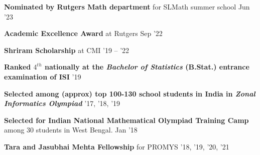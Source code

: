 \resumeProjectHeading
{\textbf{Nominated by Rutgers Math department} for SLMath summer school}
{Jun '23}
{\resumeItemListStart
{}
\resumeItemListEnd}
\vspace{\gap}

\resumeProjectHeading
{\textbf{Academic Excellence Award} at Rutgers}
{Sep '22}
{\resumeItemListStart
{}
\resumeItemListEnd}
\vspace{\gap}

\resumeProjectHeading
{\textbf{Shriram Scholarship} at CMI}
{'19 -- '22}
{\resumeItemListStart
{}
\resumeItemListEnd}
\vspace{\gap}

\resumeProjectHeading
{\textbf{Ranked $4^{th}$ nationally at the  \emph{Bachelor of Statistics} (B.Stat.) entrance examination of ISI}}
{'19}
\vspace{\mygap}

\resumeProjectHeading
{\textbf{Selected among (approx) top 100-130 school students in India in \emph{Zonal Informatics Olympiad}}}
{'17, '18, '19}
\vspace{\mygap}

\resumeProjectHeading
{\textbf{Selected for \textbf{Indian National Mathematical Olympiad} Training Camp} among 30 students in West Bengal.}
{Jan '18}
\vspace{\mygap}

\resumeProjectHeading
{\textbf{Tara and Jasubhai Mehta Fellowship} for PROMYS}
{'18, '19, '20, '21}



